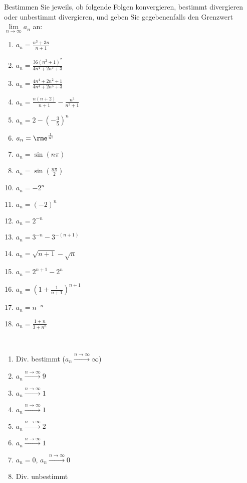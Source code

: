 \documentclass[12pt,answers]{exam}
\begin{document}
\begin{questions}
Bestimmen Sie jeweils, ob folgende Folgen konvergieren, bestimmt divergieren oder unbestimmt divergieren, und geben Sie gegebenenfalls den Grenzwert $\lim\limits_{n\to\infty} a_n$ an:\\
\parbox{0.5\textwidth}{\begin{enumerate}
\item $a_n=\frac{n^3+3n}{n+1}$
\item $a_n=\frac{36(n^2+1)^2}{4n^4+2n^3+3}$
\item $a_n=\frac{4n^4+2n^2+1}{4n^4+2n^3+3}$
\item $a_n=\frac{n(n+2)}{n+1}-\frac{n^3}{n^2+1}$
\item $a_n=2-\left(-\frac{3}{5}\right)^n$
\item $a_n=\rme^{\frac{1}{n!}}$
\item $a_n=\sin(n\pi)$
\item $a_n=\sin\left(\frac{n\pi}{2}\right)$
\end{enumerate}}\parbox{0.5\textwidth}{\begin{enumerate}\setcounter{enumi}{9}
\item $a_n=-2^n$
\item $a_n=(-2)^n$
\item $a_n=2^{-n}$
\item $a_n=3^{-n}-3^{-(n+1)}$
\item $a_n=\sqrt{n+1}-\sqrt{n}$
\item $a_n=2^{n+1}-2^n$
\item $a_n=\left(1+\frac{1}{n+1}\right)^{n+1}$
\item $a_n=n^{-n}$
\item $a_n=\frac{1+n}{3+n^n}$
\end{enumerate}}
\begin{solution}\\
\parbox{0.5\textwidth}{\begin{enumerate}
\item Div. bestimmt ($a_n\stackrel{n\to\infty}{\longrightarrow}\infty$)
\item $a_n\stackrel{n\to\infty}{\longrightarrow}9$
\item $a_n\stackrel{n\to\infty}{\longrightarrow}1$
\item $a_n\stackrel{n\to\infty}{\longrightarrow}1$
\item $a_n\stackrel{n\to\infty}{\longrightarrow}2$
\item $a_n\stackrel{n\to\infty}{\longrightarrow}1$
\item $a_n=0$, $a_n\stackrel{n\to\infty}{\longrightarrow}0$
\item Div. unbestimmt

\end{enumerate}}
\end{solution}
\end{questions}
\end{document}

